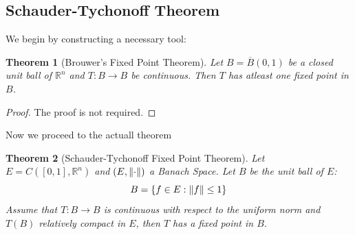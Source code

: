 \documentclass[a4paper, 12pt]{book}
\newtheorem{theorem}{Theorem}[chapter]
\begin{document}
\subsection{Schauder-Tychonoff Theorem}
We begin by constructing a necessary tool:
\begin{theorem}
	[Brouwer's Fixed Point Theorem]
	Let \( B=\overline{B}(0,1) \) be a closed unit ball of \( \mathbb{R}^n \) and \( T:B\to B \) be continuous. Then \( T \) has atleast one fixed point in \( B \).
\end{theorem}
\begin{proof}
	The proof is not required.
\end{proof}
Now we proceed to the actuall theorem
\begin{theorem}
	[Schauder-Tychonoff Fixed Point Theorem]
	Let \( E=C([0,1], \mathbb{R}^n) \) and \( (E,\norm{\cdot})\) a Banach Space.  Let \( B \) be the unit ball of \( E \): \[
		B=\{ f\in E:  \norm{f} \leq 1\}
	\]
	Assume that \( T:B\to B \) is continuous with respect to the uniform norm and \( T(B) \) relatively compact in \( E \), then \( T \) has a fixed point in \( B \).
\end{theorem}
\end{document}
